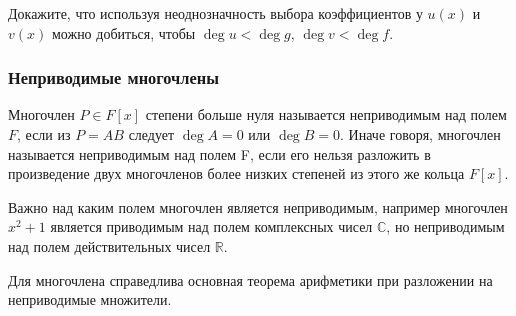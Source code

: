 \begin{exercise}
    Докажите, что используя неоднозначность выбора коэффициентов у $u(x)$ и $v(x)$ можно добиться, 
    чтобы $\deg u < \deg g$, $\deg v < \deg f$.
\end{exercise}

\subsubsection{Неприводимые многочлены}

\begin{definition}
    Многочлен $P \in F[x]$ степени больше нуля называется неприводимым над полем $F$, если из $P = AB$ 
    следует $\deg A = 0$ или $\deg B = 0$.
    Иначе говоря, многочлен называется неприводимым над полем F, если его нельзя разложить в 
    произведение двух многочленов более низких степеней из этого же кольца $F[x]$.
\end{definition}

\begin{note}
    Важно над каким полем многочлен является неприводимым, например многочлен $x^2 + 1$ является 
    приводимым над полем комплексных чисел $\mathbb{C}$, но неприводимым над полем действительных 
    чисел $\mathbb{R}$.
\end{note}

\begin{note}
    Для многочлена справедлива основная теорема арифметики при разложении на неприводимые множители. 
\end{note}

